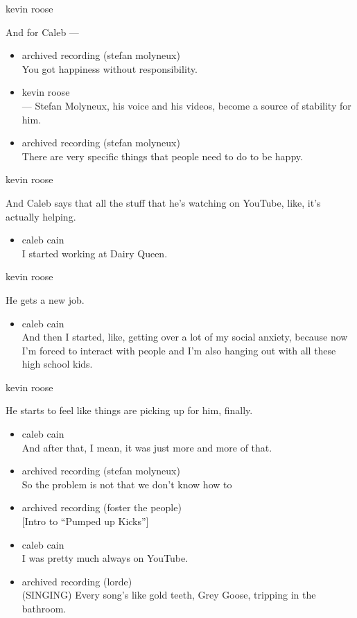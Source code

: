 kevin roose

And for Caleb ---

\begin{itemize}
\item
  archived recording (stefan molyneux)\\
  You got happiness without responsibility.
\item
  kevin roose\\
  --- Stefan Molyneux, his voice and his videos, become a source of
  stability for him.
\item
  archived recording (stefan molyneux)\\
  There are very specific things that people need to do to be happy.
\end{itemize}

kevin roose

And Caleb says that all the stuff that he's watching on YouTube, like,
it's actually helping.

\begin{itemize}
\tightlist
\item
  caleb cain\\
  I started working at Dairy Queen.
\end{itemize}

kevin roose

He gets a new job.

\begin{itemize}
\tightlist
\item
  caleb cain\\
  And then I started, like, getting over a lot of my social anxiety,
  because now I'm forced to interact with people and I'm also hanging
  out with all these high school kids.
\end{itemize}

kevin roose

He starts to feel like things are picking up for him, finally.

\begin{itemize}
\item
  caleb cain\\
  And after that, I mean, it was just more and more of that.
\item
  archived recording (stefan molyneux)\\
  So the problem is not that we don't know how to
\item
  archived recording (foster the people)\\
  {[}Intro to ``Pumped up Kicks''{]}
\item
  caleb cain\\
  I was pretty much always on YouTube.
\item
  archived recording (lorde)\\
  (SINGING) Every song's like gold teeth, Grey Goose, tripping in the
  bathroom.
\end{itemize}

